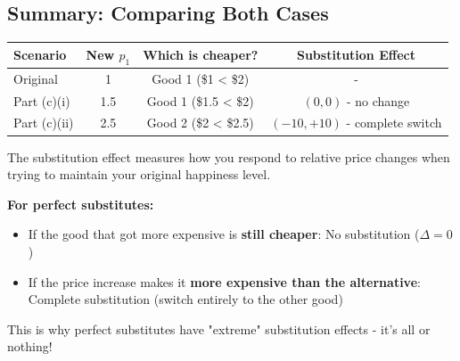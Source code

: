 \documentclass[11pt]{article}
\begin{document}
\subsection{Summary: Comparing Both Cases}

\begin{center}
\begin{tabular}{|l|c|c|c|}
\hline
\textbf{Scenario} & \textbf{New $p_1$} & \textbf{Which is cheaper?} & \textbf{Substitution Effect} \\
\hline
Original & 1 & Good 1 (\$1 < \$2) & - \\
\hline
Part (c)(i) & 1.5 & Good 1 (\$1.5 < \$2) & $(0, 0)$ - no change \\
\hline
Part (c)(ii) & 2.5 & Good 2 (\$2 < \$2.5) & $(-10, +10)$ - complete switch \\
\hline
\end{tabular}
\end{center}

\begin{tcolorbox}[colback=blue!5!white,colframe=blue!75!black,title=Big Picture]
The substitution effect measures how you respond to relative price changes when trying to maintain your original happiness level.

\textbf{For perfect substitutes:}
\begin{itemize}
\item If the good that got more expensive is \textbf{still cheaper}: No substitution ($\Delta = 0$)
\item If the price increase makes it \textbf{more expensive than the alternative}: Complete substitution (switch entirely to the other good)
\end{itemize}

This is why perfect substitutes have "extreme" substitution effects - it's all or nothing!
\end{tcolorbox}
\end{document}
